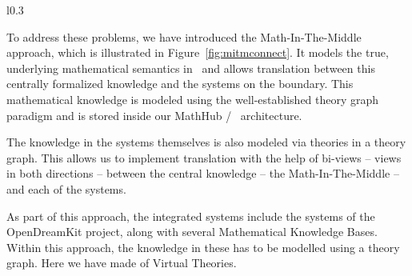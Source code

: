 \begin{wrapfigure}{l}{0.3\textwidth}
  \begin{center}
  \end{center}

  \caption[The MITM Approach to Connecting Systems]{
    The MiTM Approach to Connecting Systems. 
  }
  \label{fig:mitmconnect}
\end{wrapfigure}
To address these problems, we have introduced the Math-In-The-Middle approach, which is illustrated in Figure~\ref{fig:mitmconnect}. 
It models the true, underlying mathematical semantics in \mmt\ and allows translation between this centrally formalized knowledge and the systems on the boundary.
This mathematical knowledge is modeled using the well-established theory graph paradigm and is stored inside our MathHub / \mmt\ architecture. 

The knowledge in the systems themselves is also modeled via theories in a theory graph.
This allows us to implement translation with the help of bi-views -- views in both directions -- between the central knowledge -- the Math-In-The-Middle -- and each of the systems. 

As part of this approach, the integrated systems include the systems of the OpenDreamKit project, along with several Mathematical Knowledge Bases. 
Within this approach, the knowledge in these has to be modelled using a theory graph. 
Here we have made of Virtual Theories. 


